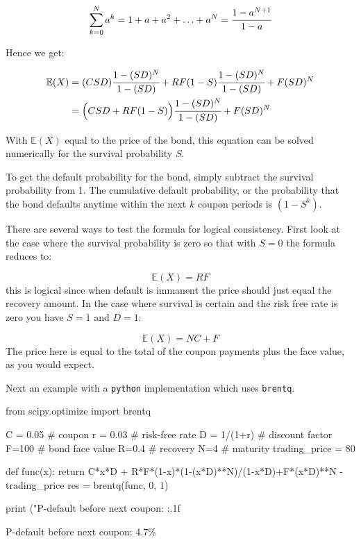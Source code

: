 \begin{attention}
\begin{equation}\sum_{k=0}^N a^k = 1 + a + a^2 + \ldots + a^N = \cfrac{1-a^{N+1}}{1-a} \end{equation}

Hence we get:

\begin{align}
\begin{split}
\mathbb{E}(X) &= (CSD) \cfrac{1-(SD)^N}{1-(SD)}+RF(1-S)\cfrac{1-(SD)^N}{1-(SD)} + F(SD)^N \\
&= \Big(CSD + RF(1-S)\Big)\cfrac{1-(SD)^N}{1-(SD)} + F(SD)^N 
\end{split}
\end{align}

With $\mathbb{E}(X)$ equal to the price of the bond, this equation can be solved numerically for the survival probability $S$.

To get the default probability for the bond, simply subtract the survival
probability from 1. The cumulative default probability, or the probability that the bond defaults anytime within the next $k$ coupon periods is $(1 - S^k)$.

There are several ways to test the formula for logical consistency. First look
at the case where the survival probability is zero so that with $S = 0$ the
formula reduces to:

\begin{equation}
\mathbb{E}(X) = RF
\end{equation}
this is logical since when default is immanent the price should just equal the
recovery amount.
In the case where survival is certain and the risk free rate is zero you have
$S = 1$ and $D=1$:

\begin{equation}
\mathbb{E}(X) = NC + F 
\end{equation}
The price here is equal to the total of the coupon payments plus the face
value, as you would expect.

Next an example with a \texttt{python} implementation which uses \texttt{brentq}.

\begin{attpython}
from scipy.optimize import brentq

C = 0.05 # coupon
r = 0.03 # risk-free rate
D = 1/(1+r) # discount factor
F=100 # bond face value
R=0.4 # recovery
N=4 # maturity
trading_price = 80

def func(x):
    return C*x*D + R*F*(1-x)*(1-(x*D)**N)/(1-x*D)+F*(x*D)**N
        -trading_price
res = brentq(func, 0, 1)

print ("P-default before next coupon: {:.1f}%
\end{attpython}
\begin{ioutput}
P-default before next coupon: 4.7\%
\end{ioutput}
\end{attention}

